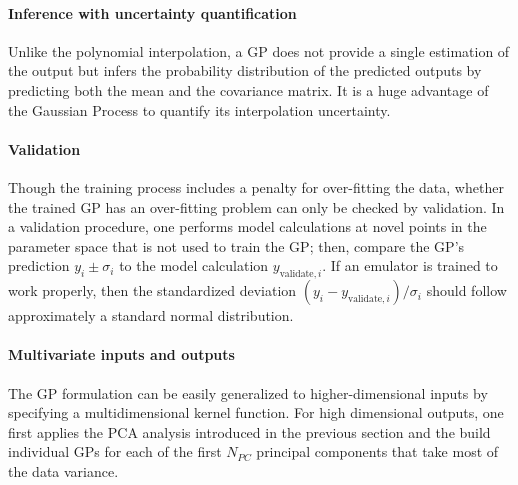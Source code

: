 \paragraph{Inference with uncertainty quantification} Unlike the polynomial interpolation, a GP does not provide a single estimation of the output but infers the probability distribution of the predicted outputs by predicting both the mean and the covariance matrix.
It is a huge advantage of the Gaussian Process to quantify its interpolation uncertainty.

\paragraph{Validation} Though the training process includes a penalty for over-fitting the data, whether the trained GP has an over-fitting problem can only be checked by validation.
In a validation procedure, one performs model calculations at novel points in the parameter space that is not used to train the GP; then, compare the GP's prediction $y_i \pm \sigma_i$ to the model calculation $y_{\textrm{validate}, i}$.
If an emulator is trained to work properly, then the standardized deviation $(y_i - y_{\textrm{validate}, i})/\sigma_i$ should follow approximately a standard normal distribution.

\paragraph{Multivariate inputs and outputs} The GP formulation can be easily generalized to higher-dimensional inputs by specifying a multidimensional kernel function.
For high dimensional outputs, one first applies the PCA analysis introduced in the previous section and the build individual GPs for each of the first $N_{PC}$ principal components that take most of the data variance.

